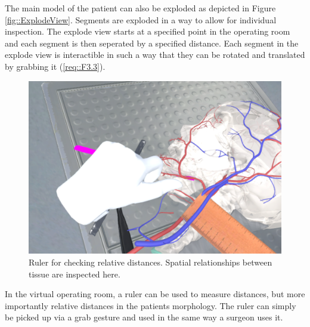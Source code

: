 The main model of the patient can also be exploded as depicted in Figure \ref{fig::ExplodeView}.
Segments are exploded in a way to allow for individual inspection.
The explode view starts at a specified point in the operating room and each segment is then seperated by a specified distance.
Each segment in the explode view is interactible in such a way that they can be rotated and translated by grabbing it (\ref{req::F3.3}).

\begin{figure}[ht]
    \centering
    \includegraphics[width=\linewidth]{images/implementation/features/visualization/ruler.png}
    \caption{\label{fig::FeatureRuler} Ruler for checking relative distances. Spatial relationships between tissue are inspected here.}
\end{figure}

In the virtual operating room, a ruler can be used to measure distances, but more importantly relative distances in the patients morphology.
The ruler can simply be picked up via a grab gesture and used in the same way a surgeon uses it.